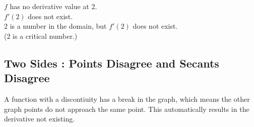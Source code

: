 \documentclass{ximera}
\begin{document}
$f$ has no derivative value at $2$.  \\

$f'(2)$ does not exist. \\

$2$ is a number in the domain, but $f'(2)$ does not exist. \\

($2$ is a critical number.)



























\subsection*{Two Sides : Points Disagree and Secants Disagree}





A function with a discontiuity has a break in the graph, which means the other graph points do not approach the same point.  This automatically results in the derivative not existing. \\
\end{document}
